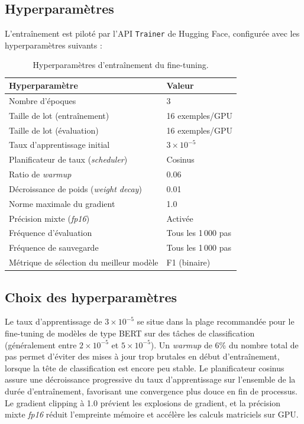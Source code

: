 ﻿\documentclass[12pt, a4paper]{report}
\begin{document}
\subsection{Hyperparamètres}

L'entraînement est piloté par l'API \texttt{Trainer} de Hugging Face,
configurée avec les hyperparamètres suivants :

\begin{table}[H]
\centering
\renewcommand{\arraystretch}{1.4}
\begin{tabular}{ll}
\toprule
\textbf{Hyperparamètre} & \textbf{Valeur} \\
\midrule
Nombre d'époques                          & 3 \\
Taille de lot (entraînement)              & 16 exemples/GPU \\
Taille de lot (évaluation)                & 16 exemples/GPU \\
Taux d'apprentissage initial              & $3 \times 10^{-5}$ \\
Planificateur de taux (\textit{scheduler})& Cosinus \\
Ratio de \textit{warmup}                  & 0.06 \\
Décroissance de poids (\textit{weight decay}) & 0.01 \\
Norme maximale du gradient                & 1.0 \\
Précision mixte (\textit{fp16})           & Activée \\
Fréquence d'évaluation                    & Tous les 1\,000 pas \\
Fréquence de sauvegarde                   & Tous les 1\,000 pas \\
Métrique de sélection du meilleur modèle  & F1 (binaire) \\
\bottomrule
\end{tabular}
\caption{Hyperparamètres d'entraînement du fine-tuning.}
\label{tab:hyperparams}
\end{table}

\subsection{Choix des hyperparamètres}

Le taux d'apprentissage de $3 \times 10^{-5}$ se situe dans la plage
recommandée pour le fine-tuning de modèles de type BERT sur des tâches
de classification (généralement entre $2 \times 10^{-5}$ et
$5 \times 10^{-5}$). Un \textit{warmup} de 6\% du nombre total de pas
permet d'éviter des mises à jour trop brutales en début d'entraînement,
lorsque la tête de classification est encore peu stable. Le planificateur
cosinus assure une décroissance progressive du taux d'apprentissage sur
l'ensemble de la durée d'entraînement, favorisant une convergence plus
douce en fin de processus. Le gradient clipping à 1.0 prévient les
explosions de gradient, et la précision mixte \textit{fp16} réduit
l'empreinte mémoire et accélère les calculs matriciels sur GPU.
\end{document}
